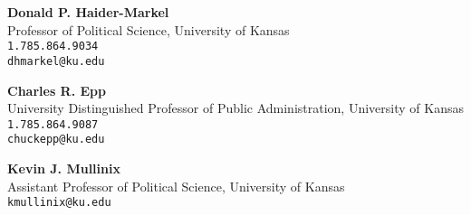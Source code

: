 \documentclass[margin,line,pifont,palatino,courier]{res}
\begin{document}
\begin{resume}
\textbf{Donald P. Haider-Markel} \\
Professor of Political Science, University of Kansas \\
\verb+1.785.864.9034+\\
\texttt{dhmarkel@ku.edu}

\textbf{Charles R. Epp} \\
University Distinguished Professor of Public Administration, University of Kansas \\
\verb+1.785.864.9087+\\
\texttt{chuckepp@ku.edu}

\textbf{Kevin J. Mullinix} \\
Assistant Professor of Political Science, University of Kansas \\
\texttt{kmullinix@ku.edu}\\

\end{resume}
\end{document}
